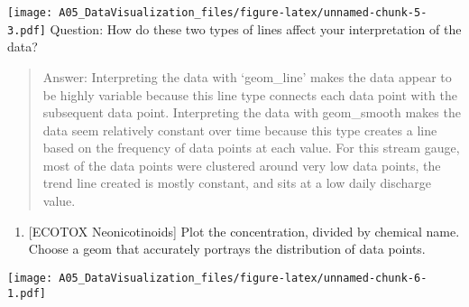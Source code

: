 \documentclass[]{article}
\newenvironment{Shaded}{\begin{snugshade}}{\end{snugshade}}
\newcommand{\KeywordTok}[1]{\textcolor[rgb]{0.13,0.29,0.53}{\textbf{#1}}}
\newcommand{\DataTypeTok}[1]{\textcolor[rgb]{0.13,0.29,0.53}{#1}}
\newcommand{\StringTok}[1]{\textcolor[rgb]{0.31,0.60,0.02}{#1}}
\newcommand{\CommentTok}[1]{\textcolor[rgb]{0.56,0.35,0.01}{\textit{#1}}}
\newcommand{\OperatorTok}[1]{\textcolor[rgb]{0.81,0.36,0.00}{\textbf{#1}}}
\newcommand{\NormalTok}[1]{#1}
\providecommand{\tightlist}{%
  \setlength{\itemsep}{0pt}\setlength{\parskip}{0pt}}
\begin{document}
\texttt{[image: A05\_DataVisualization\_files/figure-latex/unnamed-chunk-5-3.pdf]}
Question: How do these two types of lines affect your interpretation of
the data?

\begin{quote}
Answer: Interpreting the data with `geom\_line' makes the data appear to
be highly variable because this line type connects each data point with
the subsequent data point. Interpreting the data with geom\_smooth makes
the data seem relatively constant over time because this type creates a
line based on the frequency of data points at each value. For this
stream gauge, most of the data points were clustered around very low
data points, the trend line created is mostly constant, and sits at a
low daily discharge value.
\end{quote}

\begin{enumerate}
\def\labelenumi{\arabic{enumi}.}
\setcounter{enumi}{6}
\tightlist
\item
  {[}ECOTOX Neonicotinoids{]} Plot the concentration, divided by
  chemical name. Choose a geom that accurately portrays the distribution
  of data points.
\end{enumerate}

\begin{Shaded}
\end{Shaded}

\texttt{[image: A05\_DataVisualization\_files/figure-latex/unnamed-chunk-6-1.pdf]}
\end{document}
